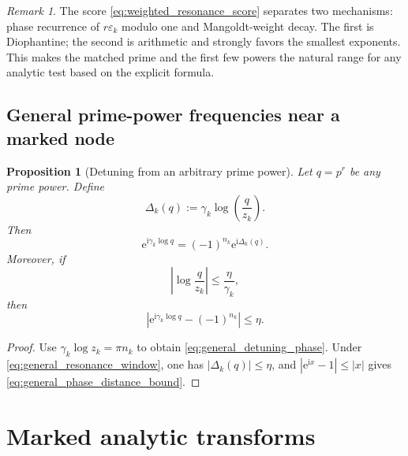 \documentclass[11pt]{amsart}
\numberwithin{equation}{section}
\theoremstyle{plain}
\newtheorem{proposition}[theorem]{Proposition}
\theoremstyle{definition}
\theoremstyle{remark}
\newtheorem{remark}[theorem]{Remark}
\newcommand{\e}{\mathrm e}
\newcommand{\ii}{\mathrm i}
\begin{document}
\begin{remark}
\label{rem:score_interpretation}
The score \eqref{eq:weighted_resonance_score} separates two mechanisms:
phase recurrence of $r\varepsilon_k$ modulo one and Mangoldt-weight decay.
The first is Diophantine; the second is arithmetic and strongly favors the
smallest exponents.  This makes the matched prime and the first few powers the
natural range for any analytic test based on the explicit formula.
\end{remark}

\subsection{General prime-power frequencies near a marked node}
\label{subsec:general_frequencies_near_node}

\begin{proposition}[Detuning from an arbitrary prime power]
\label{prop:arbitrary_prime_power_detuning}
Let $q=p^r$ be any prime power.  Define
\begin{equation}
 \Delta_k(q):=\gamma_k\log\left(\frac{q}{z_k}\right).
 \label{eq:general_detuning_definition}
\end{equation}
Then
\begin{equation}
 \e^{\ii\gamma_k\log q}
 =(-1)^{n_k}\e^{\ii\Delta_k(q)}.
 \label{eq:general_detuning_phase}
\end{equation}
Moreover, if
\begin{equation}
 \left|\log\frac{q}{z_k}\right|\leq\frac{\eta}{\gamma_k},
 \label{eq:general_resonance_window}
\end{equation}
then
\begin{equation}
 \left|\e^{\ii\gamma_k\log q}-(-1)^{n_k}\right|
 \leq\eta.
 \label{eq:general_phase_distance_bound}
\end{equation}
\end{proposition}

\begin{proof}
Use $\gamma_k\log z_k=\pi n_k$ to obtain
\eqref{eq:general_detuning_phase}.  Under
\eqref{eq:general_resonance_window}, one has
$|\Delta_k(q)|\leq\eta$, and
$|\e^{\ii x}-1|\leq|x|$ gives
\eqref{eq:general_phase_distance_bound}.
\end{proof}

\section{Marked analytic transforms}
\label{sec:marked_transforms}
\end{document}
